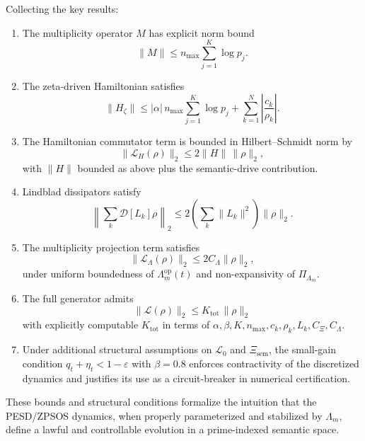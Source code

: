 \documentclass[11pt]{article}
\begin{document}
Collecting the key results:

\begin{enumerate}[label=(\roman*), nosep]
  \item The multiplicity operator \(M\) has explicit norm bound
    \[
      \|M\| \le n_{\max}\sum_{j=1}^K \log p_j.
    \]
  \item The zeta-driven Hamiltonian satisfies
    \[
      \|H_\zeta\|
      \le |\alpha|\,n_{\max}\sum_{j=1}^K \log p_j
         + \sum_{k=1}^N \left|\frac{c_k}{\rho_k}\right|.
    \]
  \item The Hamiltonian commutator term is bounded in Hilbert--Schmidt norm by
    \[
      \|\mathcal{L}_H(\rho)\|_2
      \le 2\|H\|\,\|\rho\|_2,
    \]
    with \(\|H\|\) bounded as above plus the semantic-drive contribution.
  \item Lindblad dissipators satisfy
    \[
      \left\|\sum_k \mathcal{D}[L_k]\rho\right\|_2
      \le 2\left(\sum_k \|L_k\|^2\right)\|\rho\|_2.
    \]
  \item The multiplicity projection term satisfies
    \[
      \|\mathcal{L}_\Lambda(\rho)\|_2
      \le 2 C_{\Lambda} \|\rho\|_2,
    \]
    under uniform boundedness of \(\Lambda_m^{\mathrm{op}}(t)\) and non-expansivity of \(\Pi_{\Lambda_m}\).
  \item The full generator admits
    \[
      \|\mathcal{L}(\rho)\|_2
      \le K_{\mathrm{tot}}\,\|\rho\|_2
    \]
    with explicitly computable \(K_{\mathrm{tot}}\) in terms of \(\alpha,\beta, K, n_{\max}, c_k,\rho_k, L_k, C_{\Xi},C_\Lambda\).
  \item Under additional structural assumptions on \(\mathcal{L}_0\) and \(\Xi_{\mathrm{sem}}\), the small-gain condition \(q_t + \eta_t < 1 - \varepsilon\) with \(\beta = 0.8\) enforces contractivity of the discretized dynamics and justifies its use as a circuit-breaker in numerical certification.
\end{enumerate}

These bounds and structural conditions formalize the intuition that the PESD/ZPSOS dynamics, when properly parameterized and stabilized by \(\Lambda_m\), define a lawful and controllable evolution in a prime-indexed semantic space.

\nocite{*}
  
  
\end{document}
